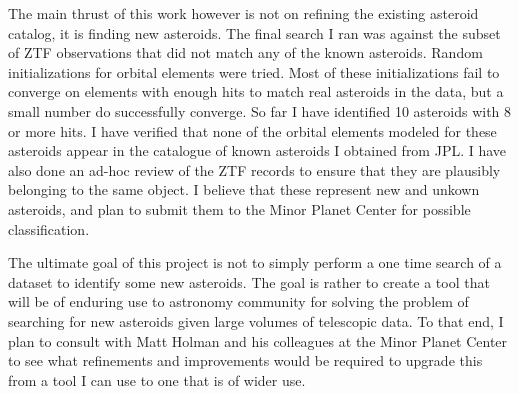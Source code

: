 The main thrust of this work however is not on refining the existing asteroid catalog, it is finding new asteroids.
The final search I ran was against the subset of ZTF observations that did not match any of the known asteroids.
Random initializations for orbital elements were tried.
Most of these initializations fail to converge on elements with enough hits to match real asteroids in the data,
but a small number do successfully converge.
So far I have identified 10 asteroids with 8 or more hits.
I have verified that none of the orbital elements modeled for these asteroids appear in the catalogue of known asteroids I obtained from JPL.
I have also done an ad-hoc review of the ZTF records to ensure that they are plausibly belonging to the same object.
I believe that these represent new and unkown asteroids, and plan to submit them to the Minor Planet Center for possible classification.

The ultimate goal of this project is not to simply perform a one time search of a dataset to identify some new asteroids.
The goal is rather to create a tool that will be of enduring use to astronomy community for solving the problem of 
searching for new asteroids given large volumes of telescopic data.
To that end, I plan to consult with Matt Holman and his colleagues at the Minor Planet Center to see what refinements and improvements
would be required to upgrade this from a tool I can use to one that is of wider use.

